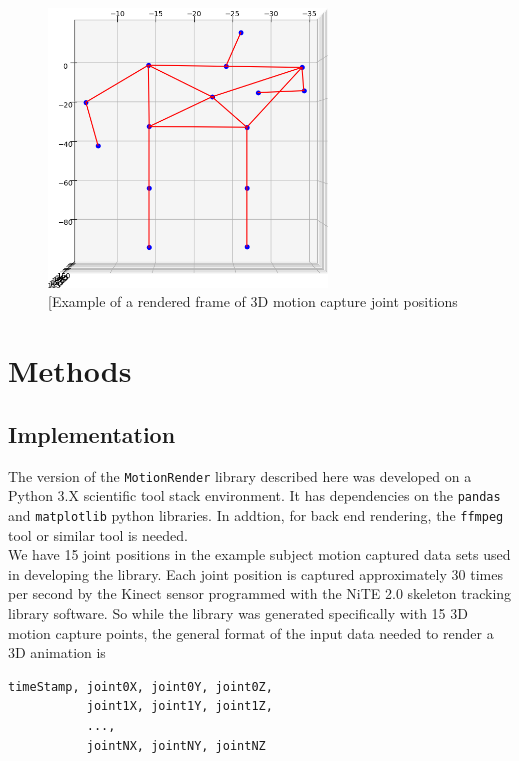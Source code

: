 \documentclass[10pt,a4paper]{article}
\begin{document}
\begin{figure}
	\centering
	\includegraphics[width=0.66\textwidth]{rendered-joint-positions.png}
	\caption{\label{fig:rendered-joint-positions}[Example of a rendered frame of 3D motion capture joint positions}
\end{figure}


\section*{Methods}
\subsection*{Implementation}
The version of the \verb|MotionRender| library described here was developed on a Python 3.X
scientific tool stack environment.  It has dependencies on the
\verb|pandas| and \verb|matplotlib| python libraries.  In addtion,
for back end rendering, the \verb|ffmpeg| tool or similar
tool is needed.
\\

We have 15 joint positions in the example subject motion captured
data sets used in
developing the library.  Each joint position is captured approximately
30 times per second by the Kinect sensor programmed with the NiTE 2.0
skeleton tracking library software.  So while the library was
generated specifically with 15 3D motion capture points, the general
format of the input data needed to render a 3D animation is
\\


\begin{verbatim}
timeStamp, joint0X, joint0Y, joint0Z, 
           joint1X, joint1Y, joint1Z, 
		   ..., 
		   jointNX, jointNY, jointNZ
\end{verbatim}
\end{document}
